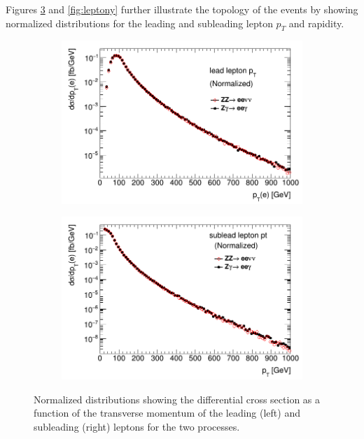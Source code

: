 \documentclass[11pt,a4paper,openright,twoside]{report}
\newcommand{\ZZ}{$ZZ\to \ell\ell\nu\nu$ }
\newcommand{\Zg}{$Z\gamma\to \ell\ell\gamma$ }
\begin{document}
Figures \ref{fig:leppt} and \ref{fig:leptony} further illustrate the topology of the events by showing normalized distributions for the leading and subleading lepton $p_T$ and rapidity.
\begin{figure}[H]
\centering
	\begin{subfigure}{0.49\textwidth}
		\includegraphics[width=\linewidth]{leadpt.png}
		\caption{}
		\label{fig:leadpt}
	\end{subfigure}
	\begin{subfigure}{0.49\textwidth}
		\includegraphics[width=\linewidth]{subleadpt.png}
		\caption{}
		\label{fig:subleadpt}
	\end{subfigure}
	\caption{Normalized distributions showing the differential cross section as a function of the transverse momentum of the leading (left) and subleading (right) leptons for the two processes.}
	\label{fig:leppt}
\end{figure}
\end{document}
